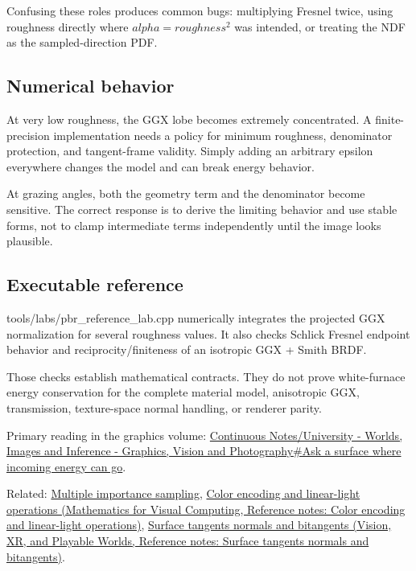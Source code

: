 Confusing these roles produces common bugs: multiplying Fresnel twice, using roughness directly where \(alpha=roughness^2\) was intended, or treating the NDF as the sampled-direction PDF.

\subsection{Numerical behavior}\label{appendix-885c1cb64ae9-numerical-behavior}

\hypertarget{appendix-885c1cb64ae9-numerical-behavior}{}

At very low roughness, the GGX lobe becomes extremely concentrated. A finite-precision implementation needs a policy for minimum roughness, denominator protection, and tangent-frame validity. Simply adding an arbitrary epsilon everywhere changes the model and can break energy behavior.

At grazing angles, both the geometry term and the denominator become sensitive. The correct response is to derive the limiting behavior and use stable forms, not to clamp intermediate terms independently until the image looks plausible.

\subsection{Executable reference}\label{appendix-885c1cb64ae9-executable-reference}

\hypertarget{appendix-885c1cb64ae9-executable-reference}{}

tools/labs/pbr\_reference\_lab.cpp numerically integrates the projected GGX normalization for several roughness values. It also checks Schlick Fresnel endpoint behavior and reciprocity/finiteness of an isotropic GGX + Smith BRDF.

Those checks establish mathematical contracts. They do not prove white-furnace energy conservation for the complete material model, anisotropic GGX, transmission, texture-space normal handling, or renderer parity.

Primary reading in the graphics volume: \hyperref[03-visual-computing-i-ch005-ask-a-surface-where-incoming-energy-can-go]{Continuous Notes/University - Worlds, Images and Inference - Graphics, Vision and Photography\#Ask a surface where incoming energy can go}.

Related: \hyperref[appendix-ca8898faf1a6]{Multiple importance sampling}, \href{../02-Mathematics-for-Visual-Computing/main.pdf\#nameddest=appendix-a9f83ad40792}{Color encoding and linear-light operations (Mathematics for Visual Computing, Reference notes: Color encoding and linear-light operations)}, \href{../07-Vision-XR-and-Playable-Worlds/main.pdf\#nameddest=appendix-e31893dec985}{Surface tangents normals and bitangents (Vision, XR, and Playable Worlds, Reference notes: Surface tangents normals and bitangents)}.

